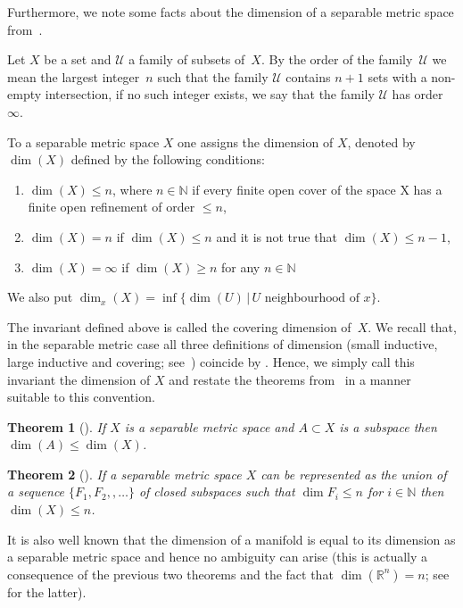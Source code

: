 \documentclass[pdftex]{sigma}
\newtheorem{tw}{Theorem}[section]
\begin{document}
Furthermore, we note some facts about the dimension of a separable metric space from~\cite{E}.
\begin{defi} Let $X$ be a set and $\mathcal{U}$ a family of subsets of~$X$. By the order of the family~$\mathcal{U}$ we mean the largest integer~$n$ such that the family $\mathcal{U}$ contains $n+ 1$ sets with a non-empty intersection, if no such integer exists, we say that the family $\mathcal{U}$ has order $\infty$.
\end{defi}
\begin{defi} To a separable metric space $X$ one assigns the dimension of $X$, denoted by $\dim(X)$ defined by the following conditions:
\begin{enumerate}\itemsep=0pt
\item[1)] $\dim(X) \leq n$, where $n\in\mathbb{N}$ if every finite open cover of the space X has a finite open refinement of order $\leq n$,
\item[2)] $\dim(X)=n$ if $\dim(X) \leq n$ and it is not true that $\dim(X) \leq n- 1$,
\item[3)] $\dim(X)=\infty$ if $\dim(X)\geq n$ for any $n\in\mathbb{N}$
\end{enumerate}
We also put $\dim_x(X)=\inf\{\dim(U) \,|\, U \text{ neighbourhood of } x\}$.
\end{defi}
\begin{rem} The invariant defined above is called the covering dimension of~$X$. We recall that, in the separable metric case all three definitions of dimension (small inductive, large inductive and covering; see~\cite{E}) coincide by \cite[Theorem~1.7.7]{E}. Hence, we simply call this invariant the dimension of $X$ and restate the theorems from~\cite{E} in a manner suitable to this convention.
\end{rem}
\begin{tw}[{\cite[Theorem~1.1.2]{E}}] If $X$ is a separable metric space and $A\subset X$ is a subspace then $\dim(A)\leq \dim(X)$.
\end{tw}
\begin{tw}[{\cite[Theorem~1.5.3]{E}\label{DCS}}] If a separable metric space $X$ can be represented as the union of a sequence $\{F_1, F_2,, \dots\}$ of closed subspaces such that $\dim{F_i}\leq n$ for $i\in\mathbb{N}$ then $\dim(X) \leq n$.
\end{tw}

It is also well known that the dimension of a manifold is equal to its dimension as a separable metric space and hence no ambiguity can arise (this is actually a consequence of the previous two theorems and the fact that $\dim(\mathbb{R}^n)=n$; see \cite[Theorem~1.8.2]{E} for the latter).
\end{document}

